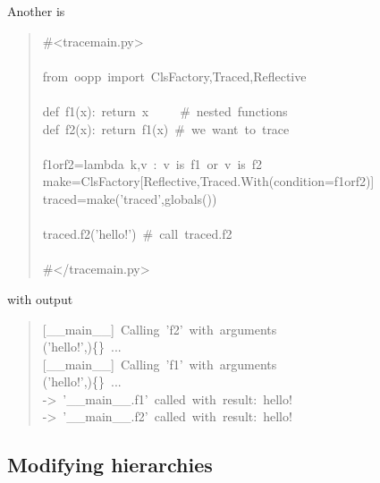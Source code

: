 \documentclass[10pt,english]{article}
\begin{document}
Another is
\begin{quote}
\begin{ttfamily}\begin{flushleft}
\mbox{{\#}<tracemain.py>}\\
\mbox{}\\
\mbox{from~oopp~import~ClsFactory,Traced,Reflective}\\
\mbox{}\\
\mbox{def~f1(x):~return~x~~~~~{\#}~nested~functions~}\\
\mbox{def~f2(x):~return~f1(x)~{\#}~we~want~to~trace}\\
\mbox{}\\
\mbox{f1orf2=lambda~k,v~:~v~is~f1~or~v~is~f2}\\
\mbox{make=ClsFactory[Reflective,Traced.With(condition=f1orf2)]}\\
\mbox{traced=make('traced',globals())}\\
\mbox{}\\
\mbox{traced.f2('hello!')~{\#}~call~traced.f2}\\
\mbox{}\\
\mbox{{\#}</tracemain.py>}
\end{flushleft}\end{ttfamily}
\end{quote}

with output
\begin{quote}
\begin{ttfamily}\begin{flushleft}
\mbox{[{\_}{\_}main{\_}{\_}]~Calling~'f2'~with~arguments}\\
\mbox{('hello!',){\{}{\}}~...}\\
\mbox{[{\_}{\_}main{\_}{\_}]~Calling~'f1'~with~arguments}\\
\mbox{('hello!',){\{}{\}}~...}\\
\mbox{->~'{\_}{\_}main{\_}{\_}.f1'~called~with~result:~hello!}\\
\mbox{->~'{\_}{\_}main{\_}{\_}.f2'~called~with~result:~hello!}
\end{flushleft}\end{ttfamily}
\end{quote}



\hypertarget{id46}{}
\subsection*{Modifying hierarchies}
\end{document}
